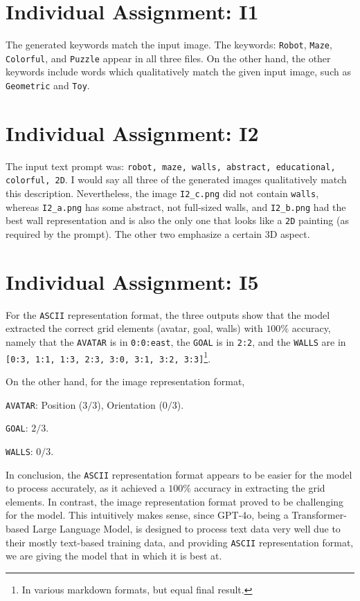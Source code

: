 \documentclass{article}
\begin{document}
\section{Individual Assignment: I1}\label{sec:i1}
The generated keywords match the input image. The keywords: \texttt{Robot}, \texttt{Maze}, \texttt{Colorful}, and \texttt{Puzzle} appear in all three files. On the other hand, the other keywords include words which qualitatively match the given input image, such as \texttt{Geometric} and \texttt{Toy}.

\section{Individual Assignment: I2}\label{sec:i2}
The input text prompt was: \texttt{robot, maze, walls, abstract, educational, colorful, 2D}. I would say all three of the generated images qualitatively match this description. Nevertheless, the image \texttt{I2\_c.png} did not contain \texttt{walls}, whereas \texttt{I2\_a.png} has some abstract, not full-sized walls, and \texttt{I2\_b.png} had the best wall representation and is also the only one that looks like a \texttt{2D} painting (as required by the prompt). The other two emphasize a certain 3D aspect.

\section{Individual Assignment: I5}\label{sec:i5}
For the \texttt{ASCII} representation format, the three outputs show that the model extracted the correct grid elements (avatar, goal, walls) with $100\%$ accuracy, namely that the \texttt{AVATAR} is in \texttt{0:0:east}, the \texttt{GOAL} is in \texttt{2:2}, and the \texttt{WALLS} are in \texttt{[0:3, 1:1, 1:3, 2:3, 3:0, 3:1, 3:2, 3:3]}\footnote{In various markdown formats, but equal final result.}.

On the other hand, for the image representation format, 
\begin{arrowlist}
    \item \texttt{AVATAR}: Position ($3/3$), Orientation ($0/3$).
    \item \texttt{GOAL}: $2/3$.
    \item \texttt{WALLS}: $0/3$.
\end{arrowlist}

In conclusion, the \texttt{ASCII} representation format appears to be easier for the model to process accurately, as it achieved a $100\%$ accuracy in extracting the grid elements. In contrast, the image representation format proved to be challenging for the model. This intuitively makes sense, since GPT-4o, being a Transformer-based Large Language Model, is designed to process text data very well due to their mostly text-based training data, and providing \texttt{ASCII} representation format, we are giving the model that in which it is best at.
\end{document}
